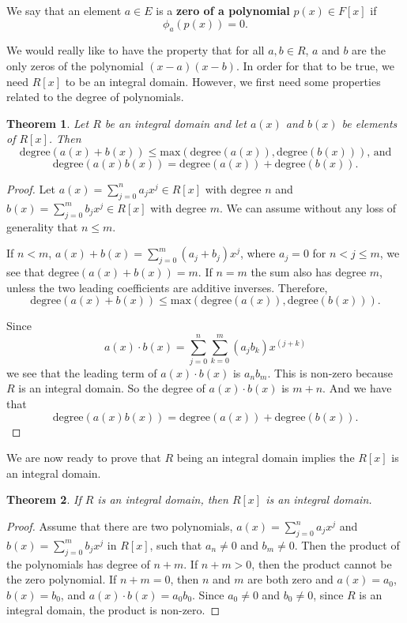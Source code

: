 \documentclass[
]{book}
\newtheorem{theorem}{Theorem}[chapter]
\theoremstyle{definition}
\theoremstyle{definition}
\theoremstyle{definition}
\theoremstyle{definition}
\theoremstyle{remark}
\begin{document}
We say that an element \(a \in E\) is a \textbf{zero of a polynomial} \(p(x)\in F[x]\) if \[\phi_a ( p(x))=0.\]

We would really like to have the property that for all \(a,b \in R\), \(a\) and \(b\) are the only zeros of the polynomial \((x-a)(x-b)\).
In order for that to be true, we need \(R[x]\) to be an integral domain. However, we first need some properties related to the degree of polynomials.

\begin{theorem}
Let \(R\) be an integral domain and let \(a(x)\) and \(b(x)\) be elements of \(R[x]\). Then
\[\mathrm{degree}(a(x)+b(x))\leq \mathrm{max}\left( \mathrm{degree}(a(x)), \mathrm{degree}(b(x))\right) \mbox{, and}\]
\[\mathrm{degree}\left( a(x) b(x)\right) = \mathrm{degree}(a(x))+\mathrm{degree}(b(x)).\]
\end{theorem}

\begin{proof}
Let \(a(x)=\sum_{j=0}^n a_j x^j \in R[x]\) with degree \(n\) and \(b(x)=\sum_{j=0}^m b_j x^j\in R[x]\) with degree \(m\). We can assume without any loss of generality that \(n\leq m\).

If \(n<m\), \(a(x)+b(x) = \sum_{j=0}^m (a_j+b_j) x^j\), where \(a_j=0\) for \(n<j\leq m\), we see that \(\mathrm{degree} (a(x)+b(x)) =m\). If \(n=m\) the sum also has degree \(m\), unless the two leading coefficients are additive inverses. Therefore, \[\mathrm{degree}(a(x)+b(x))\leq \mathrm{max}\left( \mathrm{degree}(a(x)), \mathrm{degree}(b(x))\right).\]

Since
\[a(x) \cdot b(x)  = \sum_{j=0}^n \sum_{k=0}^m \left(a_j b_k\right) x^{(j+k)}\] we see that the leading term of \(a(x)\cdot b(x)\) is \(a_n b_m\). This is non-zero because \(R\) is an integral domain. So the degree of \(a(x) \cdot b(x)\) is \(m+n\). And we have that \[\mathrm{degree}\left( a(x) b(x)\right) = \mathrm{degree}(a(x))+\mathrm{degree}(b(x)).\]
\end{proof}

We are now ready to prove that \(R\) being an integral domain implies the \(R[x]\) is an integral domain.

\begin{theorem}
\protect\hypertarget{thm:Polynomial-Integral-Domain}{}\label{thm:Polynomial-Integral-Domain}If \(R\) is an integral domain, then \(R[x]\) is an integral domain.
\end{theorem}

\begin{proof}
Assume that there are two polynomials, \(a(x)=\sum_{j=0}^n a_j x^j\) and \(b(x)=\sum_{j=0}^m b_j x^j\) in \(R[x]\), such that \(a_n\neq 0\) and \(b_m\neq 0\). Then the product of the polynomials has degree of \(n+m\). If \(n+m>0\), then the product cannot be the zero polynomial. If \(n+m=0\), then \(n\) and \(m\) are both zero and \(a(x)=a_0\), \(b(x)=b_0\), and \(a(x)\cdot b(x)=a_0 b_0\). Since \(a_0\neq 0\) and \(b_0\neq 0\), since \(R\) is an integral domain, the product is non-zero.
\end{proof}
\end{document}
